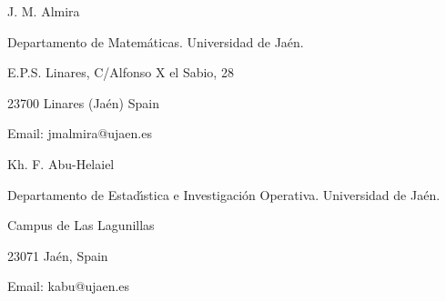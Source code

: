 \documentclass[12pt,a4paper]{amsart}
\theoremstyle{definition}
\begin{document}
\bigskip

\footnotesize{J. M. Almira

Departamento de Matem\'{a}ticas. Universidad de Ja\'{e}n.

E.P.S. Linares,  C/Alfonso X el Sabio, 28

23700 Linares (Ja\'{e}n) Spain

Email: jmalmira@ujaen.es }

\vspace{1cm}

\footnotesize{Kh. F. Abu-Helaiel

Departamento de Estad\'{\i}stica e Investigaci\'{o}n Operativa. Universidad de Ja\'{e}n.

Campus de Las Lagunillas

23071 Ja\'{e}n, Spain

Email: kabu@ujaen.es
}
\end{document}
